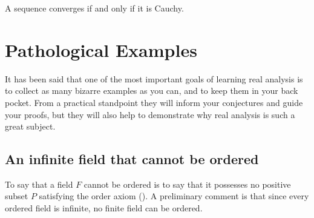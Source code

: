 \documentclass[11pt,twoside=off,numbers=noenddot]{scrbook}
\begin{document}
\begin{theorem}
  A sequence converges if and only if it is Cauchy.
\end{theorem}






\appendix

\chapter{Pathological Examples}
It has been said that one of the most important goals of learning
real analysis is to collect as many bizarre examples as you can, and
to keep them in your back pocket. From a practical standpoint they
will inform your conjectures and guide your proofs, but they will
also help to demonstrate why real analysis is such a great subject.

\section{An infinite field that cannot be ordered}
To say that a field $F$ cannot be ordered is to say that it possesses
no positive subset $P$ satisfying the order axiom
(). A preliminary comment is that since every
ordered field is infinite, no finite field can be ordered.
\end{document}
